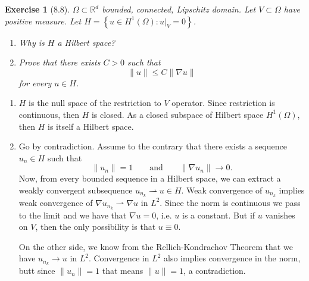 \documentclass[letterpaper,twoside,11pt]{article}
\theoremstyle{mystyle}
\newtheorem*{exercise}{Exercise}
\newcommand{\R}{{\mathbb R}}
\begin{document}
\newpage 
\begin{exercise}[8.8]
  $\Omega \subset \R^d$ bounded, connected, Lipschitz domain. Let $V \subset \Omega$ have positive measure. Let $H = \left\{ u \in H^1 (\Omega) : u|_V = 0 \right\}$. 
  \begin{enumerate}
    \item Why is $H$ a Hilbert space? 
    \item Prove that there exists $C>0$ such that 
    \[\|u\| \leq C \|\nabla u\|\]
    for every $u \in H$. 
  \end{enumerate}
\end{exercise}

\begin{enumerate}
  \item $H$ is the null space of the restriction to $V$ operator. Since restriction is continuous, then $H$ is closed. As a closed subspace of Hilbert space $H^1\left( \Omega \right)$, then $H$ is itself a Hilbert space. 
  \item Go by contradiction. Assume to the contrary that there exists a sequence $u_n \in H$ such that 
  \[\|u_n\|= 1 \qquad \text{and} \qquad \|\nabla u_n\| \to 0.\]
  Now, from every bounded sequence in a Hilbert space, we can extract a weakly convergent subsequence $u_{n_k} \rightharpoonup u \in H$. Weak convergence of $u_{n_k}$ implies weak convergence of $\nabla u_{n_k} \rightharpoonup \nabla u$ in $L^2$. Since the norm is continuous we pass to the limit and we have that $\nabla u = 0$, i.e. $u$ is a constant. But if $u$ vanishes on $V$, then the only possibility is that $u \equiv 0$. 

  On the other side, we know from the Rellich-Kondrachov Theorem that we have $u_{n_k} \to u$ in $L^2$. Convergence in $L^2$ also implies convergence in the norm, butt since $\|u_n\| = 1$ that means $\|u\| = 1$, a contradiction. 

\end{enumerate}
\end{document}
